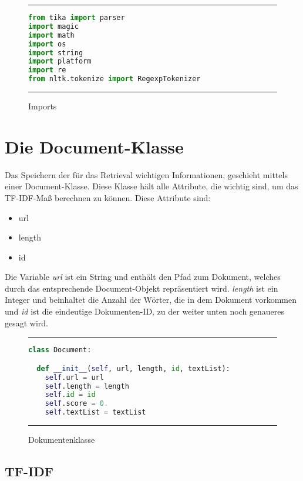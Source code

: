 \begin{figure}[h]
	\rule{\textwidth}{0.4pt}
		\begin{lstlisting}[language=Python]
from tika import parser
import magic
import math
import os
import string
import platform
import re
from nltk.tokenize import RegexpTokenizer
		\end{lstlisting}
	\rule{\textwidth}{0.4pt}
	\caption{Imports}
	\label{fig:import}
\end{figure}

\section{Die Document-Klasse}\label{die-document-klasse}

Das Speichern der für das Retrieval wichtigen Informationen, geschieht mittels einer Document-Klasse. Diese Klasse hält alle Attribute, die wichtig sind, um das TF-IDF-Maß berechnen zu können. Diese Attribute sind:
\begin{itemize}
	\item url
	\item length 
	\item id
\end{itemize} 
Die Variable \emph{url} ist ein String und enthält den Pfad zum Dokument, welches durch das entsprechende Document-Objekt repräsentiert wird. \emph{length} ist ein Integer und beinhaltet die Anzahl der Wörter, die in dem Dokument vorkommen und \emph{id} ist die eindeutige Dokumenten-ID, zu der weiter unten noch genaueres gesagt wird.

\begin{figure}[h]
	\rule{\textwidth}{0.4pt}
		\begin{lstlisting}[language=Python]
class Document:

  def __init__(self, url, length, id, textList):
    self.url = url
    self.length = length
    self.id = id
    self.score = 0.
    self.textList = textList
		\end{lstlisting}
	\rule{\textwidth}{0.4pt}
	\caption{Dokumentenklasse}
	\label{fig:document}
\end{figure}

\subsection{TF-IDF}\label{tf-idf}

